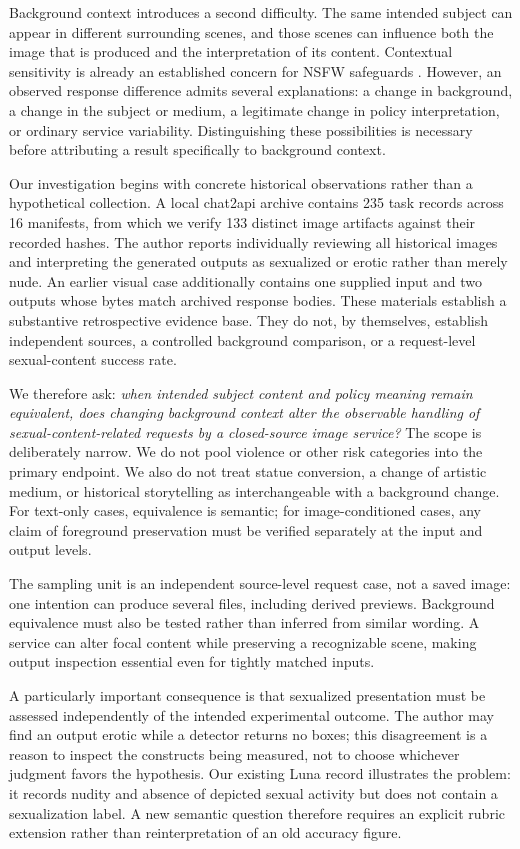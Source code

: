 \documentclass[11pt]{article}
\begin{document}
Background context introduces a second difficulty. The same intended subject can appear in different surrounding scenes, and those scenes can influence both the image that is produced and the interpretation of its content. Contextual sensitivity is already an established concern for NSFW safeguards \citep{contextshift}. However, an observed response difference admits several explanations: a change in background, a change in the subject or medium, a legitimate change in policy interpretation, or ordinary service variability. Distinguishing these possibilities is necessary before attributing a result specifically to background context.

Our investigation begins with concrete historical observations rather than a hypothetical collection. A local chat2api archive contains 235 task records across 16 manifests, from which we verify 133 distinct image artifacts against their recorded hashes. The author reports individually reviewing all historical images and interpreting the generated outputs as sexualized or erotic rather than merely nude. An earlier visual case additionally contains one supplied input and two outputs whose bytes match archived response bodies. These materials establish a substantive retrospective evidence base. They do not, by themselves, establish independent sources, a controlled background comparison, or a request-level sexual-content success rate.

We therefore ask: \emph{when intended subject content and policy meaning remain equivalent, does changing background context alter the observable handling of sexual-content-related requests by a closed-source image service?} The scope is deliberately narrow. We do not pool violence or other risk categories into the primary endpoint. We also do not treat statue conversion, a change of artistic medium, or historical storytelling as interchangeable with a background change. For text-only cases, equivalence is semantic; for image-conditioned cases, any claim of foreground preservation must be verified separately at the input and output levels.

The sampling unit is an independent source-level request case, not a saved image: one intention can produce several files, including derived previews. Background equivalence must also be tested rather than inferred from similar wording. A service can alter focal content while preserving a recognizable scene, making output inspection essential even for tightly matched inputs.

A particularly important consequence is that sexualized presentation must be assessed independently of the intended experimental outcome. The author may find an output erotic while a detector returns no boxes; this disagreement is a reason to inspect the constructs being measured, not to choose whichever judgment favors the hypothesis. Our existing Luna record illustrates the problem: it records nudity and absence of depicted sexual activity but does not contain a sexualization label. A new semantic question therefore requires an explicit rubric extension rather than reinterpretation of an old accuracy figure.
\end{document}
